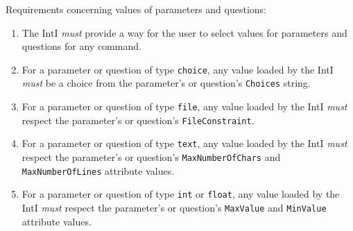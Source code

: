 \documentclass[11pt]{article}
\newcommand{\must}{{\it must}}
\newcounter{coreReq}
\begin{document}
\noindent Requirements concerning values of parameters and questions:
\begin{enumerate}
\setcounter{enumi}{\value{coreReq}}

\item The IntI {\must} provide a way for the user to select values for
  parameters and questions for any command.

\item For a parameter or question of type {\tt choice}, any value loaded
  by the IntI {\must} be a choice from the parameter's or question's
  {\tt Choices} string.

\item For a parameter or question of type {\tt file}, any value loaded by
  the IntI {\must} respect the parameter's or question's {\tt FileConstraint}.

\item For a parameter or question of type {\tt text}, any value loaded by
  the IntI {\must} respect the parameter's or question's
  {\tt MaxNumberOfChars} and {\tt MaxNumberOfLines} attribute values.

\item For a parameter or question of type {\tt int} or {\tt float}, any
  value loaded by the IntI {\must} respect the parameter's or question's
  {\tt MaxValue} and {\tt MinValue} attribute values.

\setcounter{coreReq}{\value{enumi}}
\end{enumerate}
\end{document}
